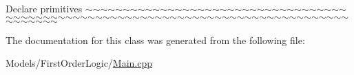  Declare primitives $\sim$$\sim$$\sim$$\sim$$\sim$$\sim$$\sim$$\sim$$\sim$$\sim$$\sim$$\sim$$\sim$$\sim$$\sim$$\sim$$\sim$$\sim$$\sim$$\sim$$\sim$$\sim$$\sim$$\sim$$\sim$$\sim$$\sim$$\sim$$\sim$$\sim$$\sim$$\sim$$\sim$$\sim$$\sim$$\sim$$\sim$$\sim$$\sim$$\sim$$\sim$$\sim$$\sim$$\sim$$\sim$$\sim$$\sim$$\sim$$\sim$$\sim$$\sim$$\sim$$\sim$$\sim$$\sim$$\sim$$\sim$$\sim$$\sim$$\sim$$\sim$$\sim$$\sim$$\sim$$\sim$$\sim$$\sim$$\sim$$\sim$$\sim$$\sim$$\sim$$\sim$$\sim$$\sim$$\sim$$\sim$$\sim$$\sim$$\sim$$\sim$$\sim$$\sim$$\sim$$\sim$$\sim$$\sim$$\sim$ 

The documentation for this class was generated from the following file\+:\begin{DoxyCompactItemize}
\item 
Models/\+First\+Order\+Logic/\hyperlink{_models_2_first_order_logic_2_main_8cpp}{Main.\+cpp}\end{DoxyCompactItemize}
